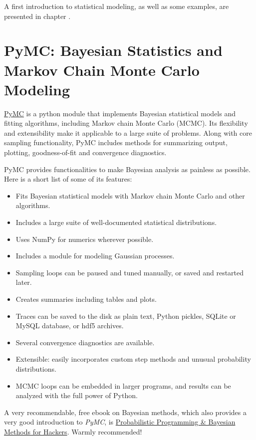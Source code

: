 A first introduction to statistical modeling, as well as some examples, are presented in chapter .

\section{PyMC: Bayesian Statistics and Markov Chain Monte Carlo Modeling}

\href{http://pymc-devs.github.io/pymc/}{PyMC} is a python module that implements Bayesian statistical models and fitting algorithms, including Markov chain Monte Carlo (MCMC). Its flexibility and extensibility make it applicable to a large suite of problems. Along with core sampling functionality, PyMC includes methods for summarizing output, plotting, goodness-of-fit and convergence diagnostics.

PyMC provides functionalities to make Bayesian analysis as painless as possible. Here is a short list of some of its features:

\begin{itemize}
    \item Fits Bayesian statistical models with Markov chain Monte Carlo and other algorithms.
    \item Includes a large suite of well-documented statistical distributions.
    \item Uses NumPy for numerics wherever possible.
    \item Includes a module for modeling Gaussian processes.
    \item Sampling loops can be paused and tuned manually, or saved and restarted later.
    \item Creates summaries including tables and plots.
    \item Traces can be saved to the disk as plain text, Python pickles, SQLite or MySQL database, or hdf5 archives.
    \item Several convergence diagnostics are available.
    \item Extensible: easily incorporates custom step methods and unusual probability distributions.
    \item MCMC loops can be embedded in larger programs, and results can be analyzed with the full power of Python.
\end{itemize}

A very recommendable, free ebook on Bayesian methods, which also provides a very good introduction to \emph{PyMC}, is \href{http://camdavidsonpilon.github.io/Probabilistic-Programming-and-Bayesian-Methods-for-Hackers/}{
Probabilistic Programming \& Bayesian Methods for Hackers}. Warmly recommended!

